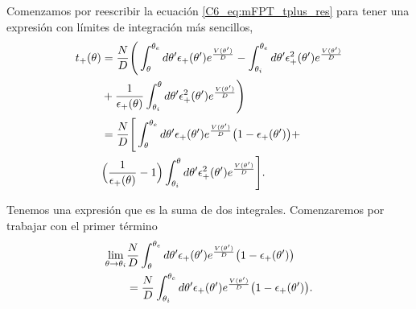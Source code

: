 \documentclass[./main.tex]{subfiles}
\begin{document}
Comenzamos por reescribir la ecuación \ref{C6_eq:mFPT_tplus_res} para tener una expresión con límites de integración más sencillos,
\begin{align}
     t_{+}(\theta)&= \frac{N}{D} \Bigg(  \int_\theta^{\theta_e} d \theta' \epsilon_{+}(\theta') e^{ \frac{V(\theta')}{D}} -  \int_{\theta_i}^{\theta_e} d\theta'  \epsilon_{+}^2(\theta') e^{ \frac{V(\theta')}{D}} \nonumber \\ & + \frac{1}{\epsilon_{+}(\theta)} \int_{\theta_i}^{\theta} d\theta'  \epsilon_{+}^2(\theta') e^{ \frac{V(\theta')}{D}} \Bigg) \nonumber \\
     &= \frac{N}{D} \Bigg[  \int_\theta^{\theta_e} d \theta' \epsilon_{+}(\theta') e^{ \frac{V(\theta')}{D}} \big(1 - \epsilon_{+}(\theta') \big)+ \nonumber \\ & \Big( \frac{1}{\epsilon_{+}(\theta)} -1 \Big) \int_{\theta_i}^{\theta} d\theta'  \epsilon_{+}^2(\theta') e^{ \frac{V(\theta')}{D}} \Bigg]. \label{C6_eq:Txi_tplus_terminos}
\end{align}

Tenemos una expresión que es la suma de dos integrales. Comenzaremos por trabajar con el primer término 
\begin{align}
     \lim_{\theta \rightarrow   \theta_i }&\frac{N}{D}  \int_\theta^{\theta_e} d \theta' \epsilon_{+}(\theta') e^{ \frac{V(\theta')}{D}} \big(1 - \epsilon_{+}(\theta') \big) \nonumber \\
     &= \frac{N}{D} \int_{\theta_i}^{\theta_e} d \theta' \epsilon_{+}(\theta') e^{ \frac{V(\theta')}{D}} \big(1 - \epsilon_{+}(\theta') \big).
     \label{C6_eq:Txi_LI1}
\end{align}
\end{document}
